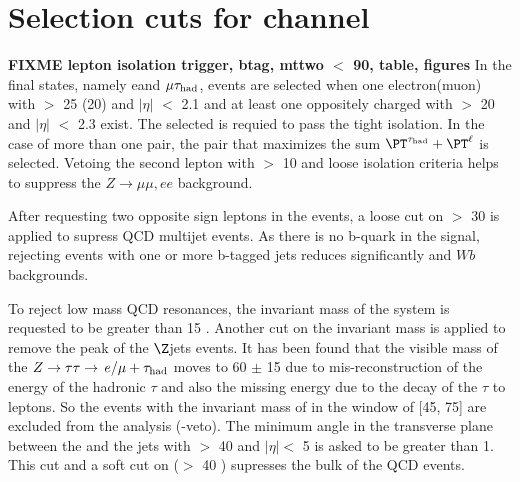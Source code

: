 \section{\texorpdfstring{Selection cuts for \leptonTau channel}{Selection cuts for lepton-tau channel}}
\label{sect:eleTauCuts}
{\bf FIXME lepton isolation trigger, btag, mttwo $<$ 90, table, figures}
In the \leptonTau final states, namely e\Tau and $\mu\tau_{\rm had}$, 
events are selected when one electron(muon) with \PT $>$ 25 (20) \GeV and $|\eta|$ $<$ 2.1 and at least 
one oppositely charged \Tau with \PT $>$ 20 \GeV and $|\eta|$ $<$ 2.3 exist. %
The selected \Tau is requied to pass the tight isolation.
In the case of more than one pair, the pair that maximizes the sum $\PT^{\Tau} + \PT^{\ell}$ is selected.
Vetoing the second lepton with \PT $>$ 10 \GeV and loose isolation criteria helps to suppress the $Z\rightarrow \mu\mu, ee$ background.

After requesting two opposite sign leptons in the events, a loose cut on \MET $>$ 30 \GeV is applied to supress QCD multijet events. 
As there is no b-quark in the signal, rejecting events with one or more b-tagged jets reduces significantly \ttbar and $Wb$ backgrounds.

To reject low mass QCD resonances, the invariant mass of the \leptonTau system  is requested to be greater than 15 \GeV. 
Another cut on the invariant mass is applied to remove the peak of the $\Z$jets events. 
It has been found that the visible mass of the $Z\to\tau\tau\to\,e/\mu +\tau_{\rm had}$ moves to 60 $\pm$ 15 \GeV due to 
mis-reconstruction of the energy of the hadronic $\tau$ and also the missing energy due to the decay of the $\tau$ to leptons. 
So the events with the invariant mass of \leptonTau in the window of [45, 75] are excluded from the analysis (\Z-veto). 
The minimum angle in the transverse plane between the \MET and the jets with \PT $>$ 40 \GeV and $|\eta| <$ 5 
is asked to be greater than 1. This cut and a soft cut on \mttwo ($>$ 40 \GeV) supresses the bulk of the QCD events.

